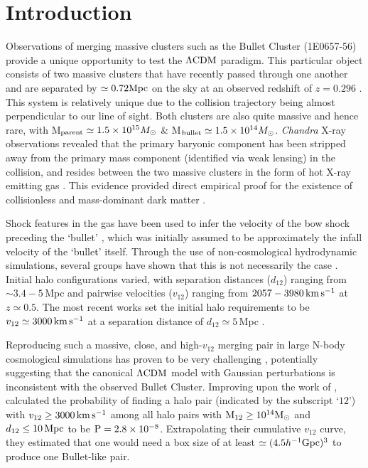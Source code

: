 \documentclass[useAMS, usenatbib]{mn2e}
\newcommand{\Msun}{M_{\odot}}
\newcommand{\hinv}{h^{-1}}
\newcommand{\vonetwo}{v_{12}}
\newcommand{\lcdm}{\Lambda\rm{CDM}}
\newcommand{\kms}{\,\rm{km}\,\rm{s}^{-1}}
\begin{document}
\section{Introduction}
 \label{sec:intro}
Observations of merging massive clusters such as the Bullet Cluster (1E0657-56)
provide a unique opportunity to test the $\lcdm$ paradigm.  This
particular object consists of two massive clusters that have recently
passed through one another and are separated by $\simeq0.72\rm{Mpc}$
on the sky at an observed redshift of $z=0.296$
\citep{Clowe04,Clowe06,Bradac06}.  This system is relatively unique
due to the collision trajectory being almost perpendicular to our
line of sight.  Both clusters are also quite massive and hence rare, with
M$_{\rm{parent}}\simeq1.5\times10^{15}\Msun$ \&
M$_{\rm{bullet}}\simeq1.5\times10^{14}\Msun$.
{\it Chandra} X-ray observations revealed that the primary
baryonic component has been stripped away from the primary mass
component (identified via weak lensing) in the collision, and resides 
between the two massive
clusters in the form of hot X-ray emitting gas \citep{Mark06}.  This
evidence provided direct empirical proof for the existence of 
collisionless and mass-dominant dark matter \citep{Clowe06}.

Shock features in the gas have been used to infer the velocity of
the bow shock preceding the `bullet'
\citep[$v_{\rm{shock}}=4740^{+710}_{-550}\kms$;][]{Mark06}, which
was initially assumed to be approximately the infall velocity of the 
`bullet' itself.  Through the use of non-cosmological hydrodynamic
simulations, several groups have shown that this is not necessarily
the case \citep{Milo07,Springel07,Mast08,Lage14}.  Initial halo
configurations varied, with separation distances ($d_{12}$) ranging
from $\sim 3.4 - 5$\,Mpc and pairwise velocities ($\vonetwo$) ranging
from $2057-3980\kms$ at $z \simeq 0.5$.  The most recent works set
the initial halo requirements to be $\vonetwo\simeq3000\kms$ at a
separation distance of $d_{12}\simeq 5$\,Mpc \citep{Mast08,Lage14b}.

Reproducing such a massive, close, and high-$\vonetwo$ merging pair
in large N-body cosmological simulations has proven to be very
challenging \citep{Hayashi06,Lee10,Thompson12,Bouillot14}, potentially
suggesting that the canonical
$\lcdm$ model with Gaussian perturbations is inconsistent with
the observed Bullet Cluster.  Improving upon the work of \citet{Lee10},
\citet{Thompson12} calculated the probability of finding a halo pair (indicated by the subscript `$12$')
with $\vonetwo\geq3000\kms$ among all halo pairs with
$\rm{M}_{12}\geq10^{14}\Msun$ and $d_{12}\leq10\,\rm{Mpc}$ to be $\rm{P}=2.8\times10^{-8}$.
Extrapolating their cumulative $\vonetwo$ curve,
they estimated that one would need a box size of at least
$\simeq(4.5\hinv\rm{Gpc})^3$ to produce one Bullet-like pair.
\end{document}
